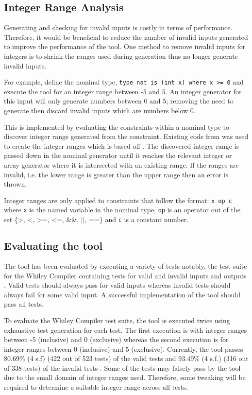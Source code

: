 \subsection{Integer Range Analysis}

Generating and checking for invalid inputs is costly in terms of performance. 
Therefore, it would be beneficial to reduce the number of invalid inputs generated to improve the performance of the tool.
One method to remove invalid inputs for integers is to shrink the ranges used during generation thus no longer generate invalid inputs.

For example, define the nominal type, \texttt{type nat is (int x) where x \textgreater= 0} and execute the tool for an integer range between -5 and 5. An integer generator for this input will only generate numbers between 0 and 5; removing the need to generate then discard invalid inputs which are numbers below 0.

This is implemented by evaluating the constraints within a nominal type to discover integer range generated from the constraint.
Existing code from \cite{whileyIntegerRangeCode} was used to create the integer ranges which is based off \cite{whileyIntegerRange}.
The discovered integer range is passed down in the nominal generator until it reaches the relevant integer or array generator where it is intersected with an existing range.
If the ranges are invalid, i.e. the lower range is greater than the upper range then an error is thrown.

Integer ranges are only applied to constraints that follow the format: \texttt{x op c} where \texttt{x} is the named variable in the nominal type, \texttt{op} is an operator out of the set \{\textgreater, \textless, \textgreater=, \textless=, \&\&, $||$, ==\} and \texttt{c} is a constant number.

\subsection{Evaluating the tool}
\label{subsec:toolEval}
The tool has been evaluated by executing a variety of tests notably, the test suite for the Whiley Compiler containing tests for valid and invalid inputs and outputs \cite{whileyCompilerTests}. 
Valid tests should always pass for valid inputs whereas invalid tests should always fail for some valid input. 
A successful implementation of the tool should pass all tests.

To evaluate the Whiley Compiler test suite, the tool is executed twice using exhaustive test generation for each test. The first execution is with integer ranges between -5 (inclusive) and 0  (exclusive) whereas the second execution is for integer ranges between 0 (inclusive) and 5 (exclusive).
Currently, the tool passes 80.69\% (4 s.f) (422 out of 523 tests) of the valid tests and 93.49\% (4 s.f.) (316 out of 338 tests) of the invalid tests \cite{qcWhileyStatistics}. Some of the tests may falsely pass by the tool due to the small domain of integer ranges used. Therefore, some tweaking will be required to determine a suitable integer range across all tests.

